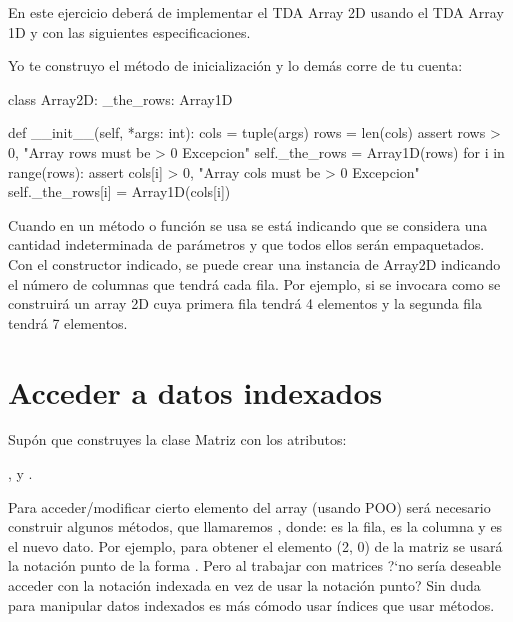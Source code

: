 En este ejercicio deberá de implementar el TDA Array 2D usando el TDA Array 1D y con las siguientes especificaciones.




Yo te construyo el método de inicialización y lo demás corre de tu cuenta:

\begin{pyverbatim}[][frame=single]
class Array2D:
  _the_rows: Array1D

  def __init__(self, *args: int):
    cols = tuple(args)
    rows = len(cols)
    assert rows > 0, "Array rows must be > 0 Excepcion"
    self._the_rows = Array1D(rows)
    for i in range(rows):
      assert cols[i] > 0, "Array cols must be > 0 Excepcion"
      self._the_rows[i] = Array1D(cols[i])
\end{pyverbatim}
Cuando en un método o función se usa  se está indicando que se considera una cantidad indeterminada de parámetros y que todos ellos serán empaquetados. Con el constructor indicado, se puede crear una instancia de Array2D indicando el número de columnas que tendrá cada fila. Por ejemplo, si se invocara como  se construirá un array 2D cuya primera fila tendrá 4 elementos y la segunda fila tendrá 7 elementos.



\separacion
\section{Acceder a datos indexados} \label{sec:datosIndexados} 

Supón que construyes la clase Matriz con los atributos:

\hfil {},  y . 

Para acceder/modificar cierto elemento del array (usando POO) será necesario construir algunos métodos, que llamaremos ,  donde:  es la fila,  es la columna y  es el nuevo dato. Por ejemplo, para obtener el  elemento (2, 0) de la matriz se usará la notación punto de la forma . Pero al trabajar con matrices ?`no sería deseable acceder con la notación indexada   en vez de usar la notación punto? Sin duda para manipular datos indexados es más cómodo usar índices que usar métodos. 


